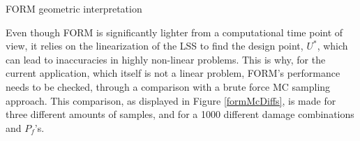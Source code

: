 \begin{algorithm}[H]
    \caption{\acrfull{FORM} geometric interpretation}
    \label{formAlg}
\end{algorithm}

\vspace{0.5cm}

Even though \gls{FORM} is significantly lighter from a computational time point of view, it relies on the linearization of the \gls{LSS} to find the design point, $U^*$, which can lead to inaccuracies in highly non-linear problems. This is why, for the current application, which itself is not a linear problem, \gls{FORM}'s performance needs to be checked, through a comparison with a brute force \gls{MC} sampling approach. This comparison, as displayed in Figure \ref{formMcDiffs}, is made for three different amounts of samples, and for a 1000 different damage combinations and $P_f$'s.

